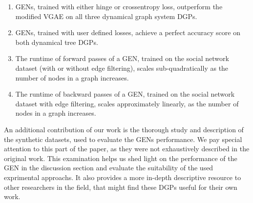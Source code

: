 \begin{enumerate}[label=\textbf{Claim} (\roman*):,leftmargin=*,align=left]
    \item GENs, trained with either hinge or crossentropy loss, outperform the modified VGAE on all three dynamical graph system DGPs.
    
    \item GENs, trained with user defined losses, achieve a perfect accuracy score on both dynamical tree DGPs.
    
    \item The runtime of forward passes of a GEN, trained on the social network dataset (with or without edge filtering), scales sub-quadratically as the number of nodes in a graph increases.
    \item The runtime of backward passes of a GEN, trained on the social network dataset  with edge filtering, scales approximately linearly, as the number of nodes in a graph increases.
\end{enumerate}

An additional contribution of our work is the thorough study and description of the synthetic datasets, used to evaluate the GENs performance. We pay special attention to this part of the paper, as they were not exhaustively described in the original work. This examination helps us shed light on the performance of the GEN in the discussion section and evaluate the suitability of the used exprimental approachs. It also provides a more in-depth descriptive resource to other researchers in the field, that might find these DGPs useful for their own work.


